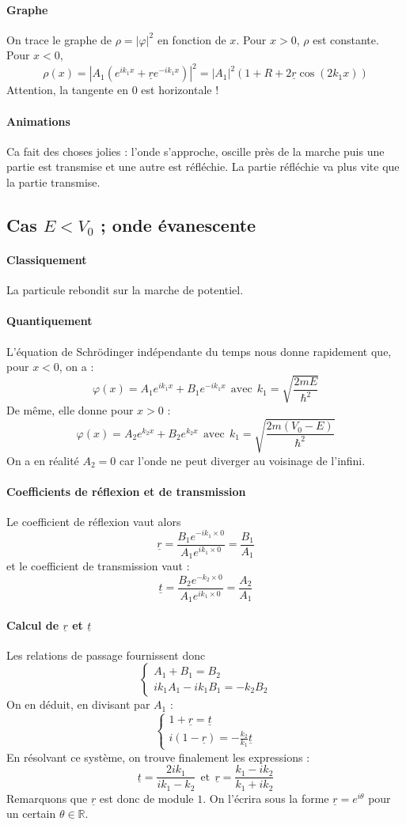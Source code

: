 \documentclass[french]{book}
\theoremstyle{plain}
\theoremstyle{definition}
\theoremstyle{remark}
\newcommand{\R}{\mathbb{R}}
\begin{document}
\paragraph{Graphe} On trace le graphe de $\rho=\lvert\varphi\rvert^2$ en fonction de $x$. Pour $x>0$, $\rho$ est constante. Pour $x<0$, $$\rho(x)=\left\lvert A_1(e^{ik_1x}+\underline{r}e^{-ik_1x})\right\rvert^2=\lvert A_1\rvert^2\left(1+R+2\underline{r}\cos(2k_1x)\right)$$ Attention, la tangente en $0$ est horizontale !
\paragraph{Animations} Ca fait des choses jolies : l'onde s'approche, oscille près de la marche puis une partie est transmise et une autre est réfléchie. La partie réfléchie va plus vite que la partie transmise.
\subsection{Cas $E<V_0$ ; onde évanescente}
\paragraph{Classiquement} La particule rebondit sur la marche de potentiel.
\paragraph{Quantiquement} L'équation de Schrödinger indépendante du temps nous donne rapidement que, pour $x<0$, on a : $$\varphi(x)=A_1e^{ik_1x}+B_1e^{-ik_1x}\ \ \text{avec} \ \ k_1=\sqrt{\frac{2mE}{\hbar^2}}$$ De même, elle donne pour $x>0$ : $$\varphi(x)=A_2e^{k_2x}+B_2e^{k_2x}\ \ \text{avec} \ \ k_1=\sqrt{\frac{2m(V_0-E)}{\hbar^2}}$$ On a en réalité $A_2=0$ car l'onde ne peut diverger au voisinage de l'infini.
\paragraph{Coefficients de réflexion et de transmission}Le coefficient de réflexion vaut alors $$\underline{r}=\frac{B_1e^{-ik_1\times 0}}{A_1e^{ik_1\times 0}}=\frac{B_1}{A_1}$$ et le coefficient de transmission vaut : $$\underline{t}=\frac{B_2e^{-k_2\times 0}}{A_1e^{ik_1\times 0}}=\frac{A_2}{A_1}$$
\paragraph{Calcul de $\underline{r}$ et $\underline{t}$} Les relations de passage fournissent donc $$\begin{cases}
	A_1+B_1=B_2 \\
	ik_1A_1-ik_1B_1=-k_2B_2
\end{cases}$$ On en déduit, en divisant par $A_1$ : $$\begin{cases}
	1+\underline{r}=\underline{t} \\
	i(1-\underline{r})=-\displaystyle\frac{k_2}{k_1}\underline{t}
\end{cases}$$ En résolvant ce système, on trouve finalement les expressions : $$\underline{t}=\frac{2ik_1}{ik_1-k_2} \ \ \text{et} \ \ \underline{r}=\frac{k_1-ik_2}{k_1+ik_2}$$ Remarquons que $\underline{r}$ est donc de module $1$. On l'écrira sous la forme $\underline{r}=e^{i\theta}$ pour un certain $\theta\in\R$.
\end{document}
